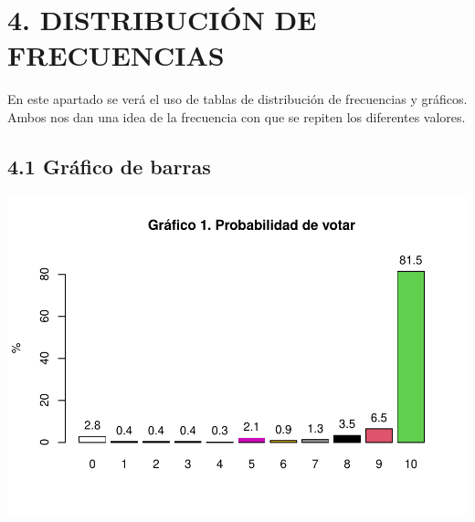 \documentclass[
  12 pt,
  a4paper,
]{article}
\newenvironment{Shaded}{\begin{snugshade}}{\end{snugshade}}
\newcommand{\AttributeTok}[1]{\textcolor[rgb]{0.13,0.29,0.53}{#1}}
\newcommand{\CommentTok}[1]{\textcolor[rgb]{0.56,0.35,0.01}{\textit{#1}}}
\newcommand{\ConstantTok}[1]{\textcolor[rgb]{0.56,0.35,0.01}{#1}}
\newcommand{\DecValTok}[1]{\textcolor[rgb]{0.00,0.00,0.81}{#1}}
\newcommand{\FunctionTok}[1]{\textcolor[rgb]{0.13,0.29,0.53}{\textbf{#1}}}
\newcommand{\NormalTok}[1]{#1}
\newcommand{\OtherTok}[1]{\textcolor[rgb]{0.56,0.35,0.01}{#1}}
\newcommand{\SpecialCharTok}[1]{\textcolor[rgb]{0.81,0.36,0.00}{\textbf{#1}}}
\newcommand{\StringTok}[1]{\textcolor[rgb]{0.31,0.60,0.02}{#1}}
\begin{document}
\begin{Shaded}
\end{Shaded}

\newpage

\hypertarget{distribuciuxf3n-de-frecuencias}{%
\section{4. DISTRIBUCIÓN DE
FRECUENCIAS}\label{distribuciuxf3n-de-frecuencias}}

En este apartado se verá el uso de tablas de distribución de frecuencias
y gráficos. Ambos nos dan una idea de la frecuencia con que se repiten
los diferentes valores.

\hypertarget{gruxe1fico-de-barras}{%
\subsection{4.1 Gráfico de barras}\label{gruxe1fico-de-barras}}

\begin{Shaded}
\end{Shaded}

\includegraphics{probabilidadVoto_files/figure-latex/graficoBarras-1.pdf}
\end{document}
